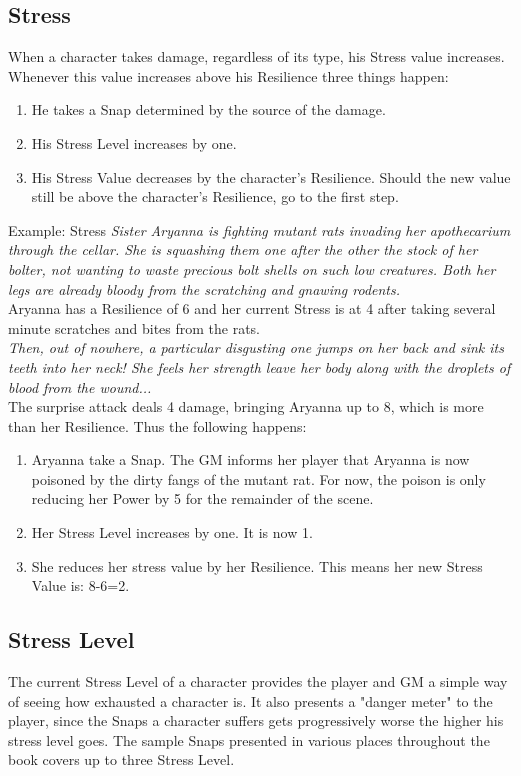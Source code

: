 \subsection{Stress}\label{Stress}
	When a character takes damage, regardless of its type, his Stress value increases.
	Whenever this value increases above his Resilience three things happen:
	\begin{enumerate}
		\item He takes a Snap determined by the source of the damage.
		\item His Stress Level increases by one.
		\item His Stress Value decreases by the character's Resilience. Should the new value still be above the character's Resilience, go to the first step.
	\end{enumerate}

	\begin{DndSidebar}{Example: Stress}
	\textit{Sister Aryanna is fighting mutant rats invading her apothecarium through the cellar. She is squashing them one after the other the stock of her bolter, not wanting to waste precious bolt shells on such low creatures. Both her legs are already bloody from the scratching and gnawing rodents.}\\
	\noindent
	Aryanna has a Resilience of 6 and her current Stress is at 4 after taking several minute scratches and bites from the rats.\\
	\noindent
	\textit{Then, out of nowhere, a particular disgusting one jumps on her back and sink its teeth into her neck! She feels her strength leave her body along with the droplets of blood from the wound...}\\
	\noindent
	The surprise attack deals 4 damage, bringing Aryanna up to 8, which is more than her Resilience. 
	Thus the following happens:
	\begin{enumerate}
		\item Aryanna take a Snap. The GM informs her player that Aryanna is now poisoned by the dirty fangs of the mutant rat. For now, the poison is only reducing her Power by 5 for the remainder of the scene.
		\item Her Stress Level increases by one. It is now 1.
		\item She reduces her stress value by her Resilience. This means her new Stress Value is: 8-6=2.
	\end{enumerate}
	\end{DndSidebar}

\subsection{Stress Level}\label{Stress_Level}
	The current Stress Level of a character provides the player and GM a simple way of seeing how exhausted a character is.
	It also presents a "danger meter" to the player, since the Snaps a character suffers gets progressively worse the higher his stress level goes.
	The sample Snaps presented in various places throughout the book covers up to three Stress Level.


